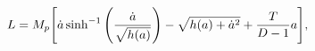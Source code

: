 \begin{equation}
L = M_p\Bigg[\dot a \sinh^{-1} \Bigg({\dot a\over {\sqrt {h(a)}}}\Bigg) -
{\sqrt{h(a) +
\dot a^2}}
+ {T \over{D-1}}a\Bigg],
\label{effectivel}
\end{equation}

